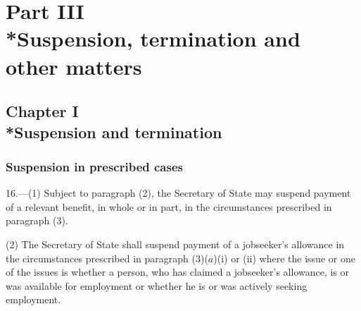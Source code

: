 \documentclass[12pt,a4paper]{article}
\begin{document}
\section[Part III --- Suspension, termination and other matters]{Part III\\*Suspension, termination and other matters}

\subsection[Chapter I --- Suspension and termination]{Chapter I\\*Suspension and termination}

\subsubsection[16. Suspension in prescribed cases]{Suspension in prescribed cases}

\renewcommand\parthead{--- Part III Chapter I}

16.—(1) Subject to paragraph (2), the Secretary of State may suspend payment of a relevant benefit, in whole or in part, in the circumstances prescribed in paragraph (3).

(2) The Secretary of State shall suspend payment of a jobseeker’s allowance in the circumstances prescribed in paragraph (3)($a$)(i) or (ii) where the issue or one of the issues is whether a person, who has claimed a jobseeker’s allowance, is or was available for employment or whether he is or was actively seeking employment.
\end{document}
